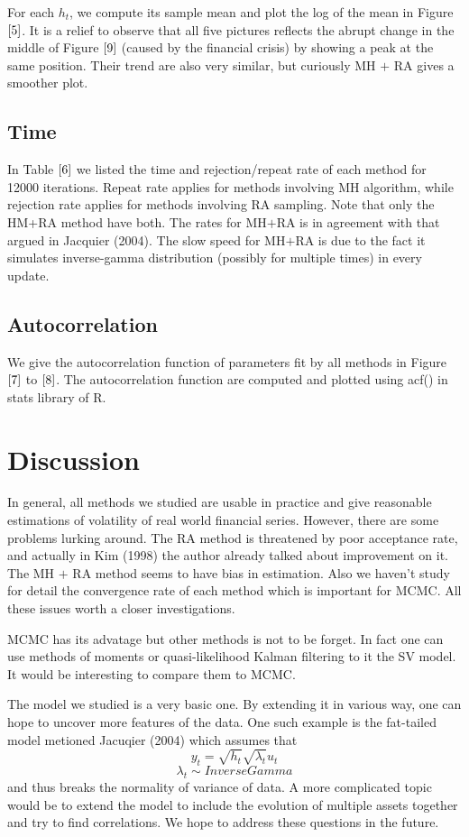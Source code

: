 \documentclass{article}
\begin{document}
For each $h_t$, we compute its sample mean and plot the log of the mean in Figure $\ref{5}$. It is a relief to observe that all five pictures reflects the abrupt change in the middle of Figure $\ref{9}$ (caused by the financial crisis) by showing a peak at the same position. Their trend are also very similar, but curiously MH $+$ RA gives a smoother plot.


\subsection{Time}
In Table $\ref{6}$  we listed the time and rejection/repeat rate of each method for 12000 iterations. Repeat rate applies for methods involving MH algorithm, while rejection rate applies for methods involving RA sampling. Note that only the HM+RA method have both. The rates for MH$+$RA is in agreement with that argued in Jacquier (2004). The slow speed for MH$+$RA is due to the fact it simulates inverse-gamma distribution (possibly for multiple times) in every update.

\subsection{Autocorrelation}
We give the autocorrelation function of parameters fit by all methods in Figure $\ref{7}$ to $\ref{8}$. The autocorrelation function are computed and plotted using acf() in stats library of R.

\section{Discussion}
In general, all methods we studied are usable in practice and give reasonable estimations of volatility of real world financial series. However, there are some problems lurking around. The RA method is threatened by poor acceptance rate, and actually in Kim (1998) the author already talked about improvement on it.  The MH $+$ RA method seems to have bias in estimation. Also we haven't study for detail the convergence rate of each method which is important for MCMC. All these  issues worth a closer investigations.

MCMC has its advatage but other methods is not to be forget. In fact one can use methods of moments or quasi-likelihood Kalman filtering to it the SV model. It would be interesting to compare them to MCMC.

The model we studied is a very basic one. By extending it in various way, one can hope to uncover more features of the data. One such example is the fat-tailed model metioned Jacuqier (2004) which assumes that
\[
y_t=\sqrt{h_t}\sqrt{\lambda_t}u_t
\]
\[
\lambda_t\sim Inverse Gamma
\]
and thus breaks the normality of variance of data. A more complicated topic would be to extend the model to include the evolution of multiple assets together and try to find correlations. We hope to address these questions in the future.
\end{document}
